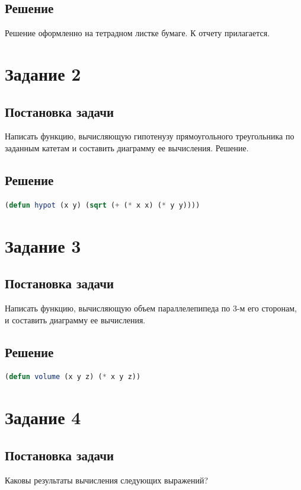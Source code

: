 \documentclass[12pt]{report}
\begin{document}
\subsection*{Решение}
Решение оформленно на тетрадном листке бумаге. К отчету прилагается.

\section*{Задание 2}
\subsection*{Постановка задачи}

Написать функцию, вычисляющую гипотенузу прямоугольного треугольника по заданным катетам и составить диаграмму ее вычисления. Решение.

\subsection*{Решение}

\begin{lstlisting}[label=second,caption=Решение задания №2, language=lisp]
(defun hypot (x y) (sqrt (+ (* x x) (* y y))))
\end{lstlisting}

\section*{Задание 3}
\subsection*{Постановка задачи}
Написать функцию, вычисляющую объем параллелепипеда по 3-м его сторонам, и составить диаграмму ее вычисления.

\subsection*{Решение}

\begin{lstlisting}[label=third,caption=Решение задания №3, language=lisp]
(defun volume (x y z) (* x y z))
\end{lstlisting}

\section*{Задание 4}
\subsection*{Постановка задачи}
Каковы результаты вычисления следующих выражений? 
\end{document}
